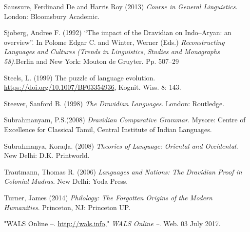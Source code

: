 \begin{thebibliography}{99}
  Saussure, Ferdinand De and Harris Roy (2013) \textit{Course in General Linguistics}. London: Bloomsbury Academic.

  Sjoberg, Andree F. (1992) “The impact of the Dravidian on Indo–Aryan: an overview”. In Polome Edgar C. and Winter, Werner (Eds.) \textit{Reconstructing Languages and Cultures} \textit{(Trends in Linguistics}, \textit{Studies and Monographs 58).}Berlin and New York: Mouton de Gruyter. Pp. 507–29

  Steels, L. (1999) The puzzle of language evolution. \url{ https://doi.org/10.1007/BF03354936}, Kognit. Wiss. 8: 143.

  Steever, Sanford B. (1998) \textit{The Dravidian Languages}. London: Routledge.

  Subrahmanyam, P.S.(2008) \textit{Dravidian Comparative Grammar}. Mysore: Centre of Excellence for Classical Tamil, Central Institute of Indian Languages.

  Subrahmaṇya, Koraḍa. (2008) \textit{Theories of Language: Oriental and Occidental}. New Delhi: D.K. Printworld.

  Trautmann, Thomas R. (2006) \textit{Languages and Nations: The Dravidian Proof in Colonial Madras}. New Delhi: Yoda Press.

  Turner, James (2014) \textit{Philology: The Forgotten Origins of the Modern Humanities}. Princeton, NJ: Princeton UP.

  "WALS Online –. \url{http://wals.info}," \textit{WALS Online –}. Web. 03 July 2017.

 \end{thebibliography}

\theendnotes

